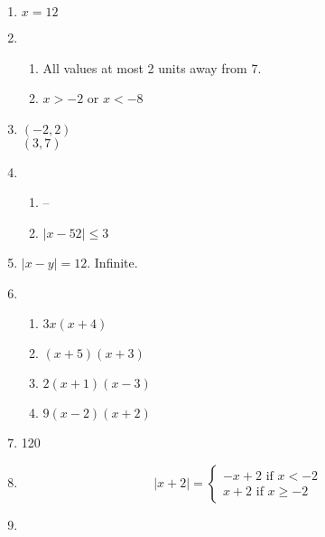 \documentclass{article}
\begin{document}
\begin{enumerate}
\item $x = 12$

\item

	\begin{enumerate}
	
	\item All values at most 2 units away from 7.
	
	\item $x > -2$ or $x < -8$
	
	\end{enumerate}
	
\item $(-2, 2)$ \\
	$(3, 7)$
	
\item

	\begin{enumerate}
	
	\item --
	
	\item $|x - 52| \leq 3$
	
	\end{enumerate}
	
\item $|x - y| = 12.$ Infinite.

\item

	\begin{enumerate}
	
	\item $3x(x + 4)$
	
	\item $(x + 5)(x + 3)$
	
	\item $2(x + 1)(x - 3)$
	
	\item $9(x - 2)(x + 2)$
	
	\end{enumerate}
	
\item 120

\item 
	\begin{equation*}
	|x + 2| =
	\begin{cases}
	-x + 2 \text{ if } x < -2 \\
	x + 2 \text{ if } x \geq -2
	\end{cases}
	\end{equation*}
	
\item


\end{enumerate}
\end{document}
